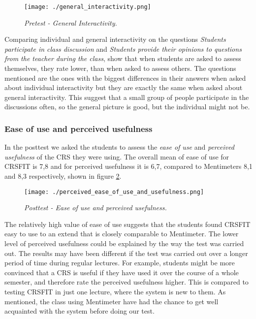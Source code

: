  \begin{figure}[H]
  \centering
     \texttt{[image: ./general\_interactivity.png]}
     \caption{\emph{Pretest - General Interactivity.}}
     \label{fig:general_interactivity}
 \end{figure}

Comparing individual and general interactivity on the questions \emph{Students participate in class discussion} and \emph{Students provide their opinions to questions from the teacher during the class}, show that when students are asked to assess themselves, they rate lower, than when asked to assess others. The questions mentioned are the ones with the biggest differences in their answers when asked about individual interactivity but they are exactly the same when asked about general interactivity. This suggest that a small group of people participate in the discussions often, so the general picture is good, but the individual might not be. 



\subsubsection*{Ease of use and perceived usefulness}

In the posttest we asked the students to assess the \emph{ease of use} and \emph{perceived usefulness} of the CRS they were using. The overall mean of ease of use for CRSFIT is 7,8 and for perceived usefulness it is 6,7, compared to Mentimeters 8,1 and 8,3 respectively, shown in figure \ref{fig:perceived_ease_of_use_and_usefulness}.

 \begin{figure}[H]
  \centering
     \texttt{[image: ./perceived\_ease\_of\_use\_and\_usefulness.png]}
     \caption{\emph{Posttest - Ease of use and perceived usefulness.}}
     \label{fig:perceived_ease_of_use_and_usefulness}
 \end{figure}
 
The relatively high value of ease of use suggests that the students found CRSFIT easy to use to an extend that is closely comparable to Mentimeter. The lower level of perceived usefulness could be explained by the way the test was carried out. The results may have been different if the test was carried out over a longer period of time during regular lectures. For example, students might be more convinced that a CRS is useful if they have used it over the course of a whole semester, and therefore rate the perceived usefulness higher. This is compared to testing CRSFIT in just one lecture, where the system is new to them. As mentioned, the class using Mentimeter have had the chance to get well acquainted with the system before doing our test.

